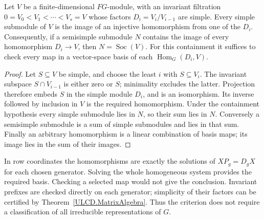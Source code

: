 \begin{theorem}\label{ULCD.Socle}
Let $V$ be a finite-dimensional $FG$-module, with an invariant filtration
$0=V_0<V_1<\cdots<V_s=V$ whose factors $D_i=V_i/V_{i-1}$ are simple.
Every simple submodule of $V$ is the image of an injective homomorphism
from one of the $D_i$. Consequently, if a semisimple submodule $N$ contains
the image of every homomorphism $D_i\to V$, then $N=\operatorname{Soc}(V)$.
For this containment it suffices to check every map in a vector-space
basis of each $\operatorname{Hom}_G(D_i,V)$.
\end{theorem}
\begin{proof}
Let $S\subseteq V$ be simple, and choose the least $i$ with $S\subseteq V_i$.
The invariant subspace $S\cap V_{i-1}$ is either zero or $S$; minimality
excludes the latter. Projection therefore embeds $S$ in the simple module
$D_i$, and is an isomorphism. Its inverse followed by inclusion in $V$
is the required homomorphism. Under the containment hypothesis every
simple submodule lies in $N$, so their sum lies in $N$. Conversely a
semisimple submodule is a sum of simple submodules and lies in that sum.
Finally an arbitrary homomorphism is a linear combination of basis maps;
its image lies in the sum of their images.
\end{proof}

In row coordinates the homomorphisms are exactly the solutions of
$XP_g=D_gX$ for each chosen generator. Solving the whole homogeneous
system provides the required basis. Checking a selected map would not
give the conclusion. Invariant prefixes are checked directly on each
generator; simplicity of their factors can be certified by
Theorem~\ref{ULCD.MatrixAlgebra}. Thus the criterion does not require a
classification of all irreducible representations of $G$.

